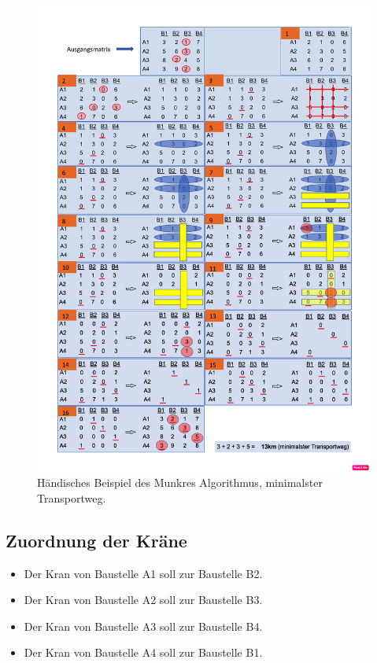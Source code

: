 \begin{figure}
\centering
\includegraphics[width=14cm]{papers/munkres/figures/Ungarische_Methode_Beispiel.png}
\caption{Händisches Beispiel des Munkres Algorithmus, minimalster Transportweg.}
\label{munkres:Vr2}
\end{figure}

\subsection{Zuordnung der Kräne
\label{munkres:subsection:malorum}}

\begin{itemize}
\item Der Kran von Baustelle A1 soll zur Baustelle B2.
\item Der Kran von Baustelle A2 soll zur Baustelle B3.
\item Der Kran von Baustelle A3 soll zur Baustelle B4.
\item Der Kran von Baustelle A4 soll zur Baustelle B1.
\end{itemize}

